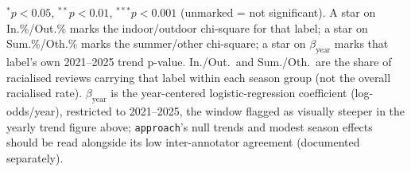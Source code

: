 \begin{table}[htbp]
\vspace{2pt}
\raggedright\footnotesize
$^{*}p<0.05$, $^{**}p<0.01$, $^{***}p<0.001$ (unmarked = not significant). A star on In.\%/Out.\% marks the indoor/outdoor chi-square for that label; a star on Sum.\%/Oth.\% marks the summer/other chi-square; a star on $\beta_{\text{year}}$ marks that label's own 2021--2025 trend p-value. In./Out.\ and Sum./Oth.\ are the share of racialised reviews carrying that label within each season group (not the overall racialised rate). $\beta_{\text{year}}$ is the year-centered logistic-regression coefficient (log-odds/year), restricted to 2021--2025, the window flagged as visually steeper in the yearly trend figure above; \texttt{approach}'s null trends and modest season effects should be read alongside its low inter-annotator agreement (documented separately).
\end{table}
